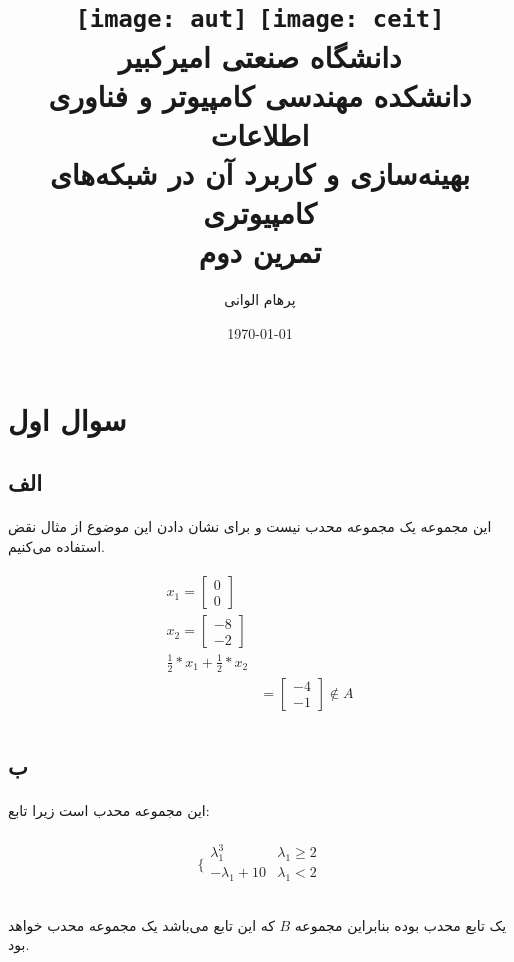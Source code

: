 \documentclass[paper=a4, fontsize=11pt]{article}
\title{
\normalfont\normalsize
\texttt{[image: aut]}
\hspace{5cm}
\texttt{[image: ceit]} \\
\textsc دانشگاه صنعتی امیرکبیر \\
\textsc دانشکده مهندسی کامپیوتر و فناوری اطلاعات
\horrule{0.5pt} \\ [0.4cm] %
\huge بهینه‌سازی و کاربرد آن در شبکه‌های کامپیوتری \\
\huge تمرین دوم 
\horrule{2pt} \\ [0.5cm] %
}
\author{پرهام الوانی}
\date{\normalsize\today} %
\numberwithin{equation}{section} %
\numberwithin{figure}{section} %
\numberwithin{table}{section} %
\begin{document}
\maketitle %

\section{سوال اول}
\subsection{الف}
\paragraph{}
این مجموعه یک مجموعه محدب نیست و برای نشان دادن این موضوع از مثال نقض استفاده می‌کنیم.

\begin{align}
\begin{split}
x_1 = \left[\begin{array}{c} 0 \\ 0 \end{array}\right] \\
x_2 = \left[\begin{array}{c} -8 \\ -2 \end{array}\right] \\
\frac{1}{2} * x_1 + \frac{1}{2} * x_2 \\
&= \left[\begin{array}{c} -4 \\ -1 \end{array}\right] \notin A \\
\end{split}
\end{align}

\subsection{ب}
\paragraph{}
این مجموعه محدب است زیرا تابع:

\begin{align}
\begin{split}
	\Big\{
		\begin{array}{lr}
		\lambda_1^3 & \lambda_1 \geq 2 \\
		-\lambda_1 + 10 & \lambda_1 < 2 \\
		\end{array}
\end{split}
\end{align}

\paragraph{}
یک تابع محدب بوده بنابراین مجموعه $B$ که  این تابع می‌باشد یک مجموعه محدب خواهد بود.
\end{document}
